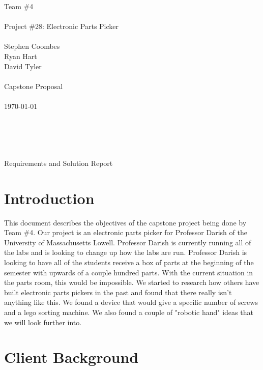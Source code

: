 \documentclass[12pt]{report}
\begin{document}

\noindent Team \#4 \\  \\
Project \#28: Electronic Parts Picker \\ \\
Stephen Coombes \\
Ryan Hart \\
David Tyler \\ \\
Capstone Proposal \\ \\
\today \\ \\ \\ \\ \\
\centerline{Requirements and Solution Report}
\newpage


\section*{Introduction}

This document describes the objectives of the capstone project being done by Team \#4. Our project is an electronic parts picker for Professor Darish of the University of Massachusetts Lowell. Professor Darish is currently running all of the labs and is looking to change up how the labs are run. Professor Darish is looking to have all of the students receive a box of parts at the beginning of the semester with upwards of a couple hundred parts. With the current situation in the parts room, this would be impossible. We started to research how others have built electronic parts pickers in the past and found that there really isn't anything like this. We found a device that would give a specific number of screws and a lego sorting machine. We also found a couple of "robotic hand" ideas that we will look further into. 


\section*{Client Background}
\end{document}
